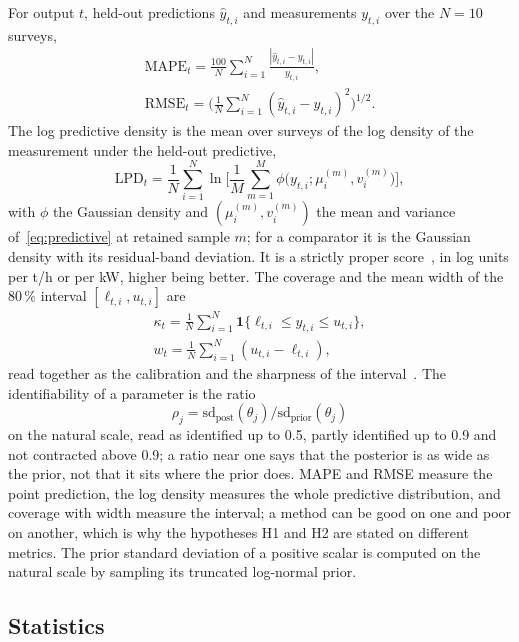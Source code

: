 \documentclass[journal]{IEEEtran}
\newcommand{\pct}{\,\%}
\begin{document}
For output $t$, held-out predictions $\hat y_{t,i}$ and measurements $y_{t,i}$ over the $N=10$ surveys,
\begin{gather}
\mathrm{MAPE}_t=\frac{100}{N}\sum_{i=1}^{N}\frac{|\hat y_{t,i}-y_{t,i}|}{y_{t,i}},\nonumber\\
\mathrm{RMSE}_t=\Big(\frac1N\sum_{i=1}^{N}(\hat y_{t,i}-y_{t,i})^2\Big)^{1/2}.
\label{eq:mape}
\end{gather}
The log predictive density is the mean over surveys of the log density of the measurement under the held-out predictive,
\begin{equation}
\mathrm{LPD}_t=\frac1N\sum_{i=1}^{N}\ln\Big[\frac1M\sum_{m=1}^{M}\phi\big(y_{t,i};\mu_{i}^{(m)},v_{i}^{(m)}\big)\Big],
\label{eq:lpd}
\end{equation}
with $\phi$ the Gaussian density and $(\mu_i^{(m)},v_i^{(m)})$ the mean and variance of~\eqref{eq:predictive} at retained sample
$m$; for a comparator it is the Gaussian density with its residual-band deviation. It is a strictly proper score~\cite{gneiting},
in log units per t/h or per kW, higher being better. The coverage and the mean width of the 80\pct{} interval
$[\ell_{t,i},u_{t,i}]$ are
\begin{gather}
\kappa_t=\frac1N\sum_{i=1}^{N}\mathbf{1}\{\ell_{t,i}\le y_{t,i}\le u_{t,i}\},\nonumber\\
w_t=\frac1N\sum_{i=1}^{N}(u_{t,i}-\ell_{t,i}),
\label{eq:coverage}
\end{gather}
read together as the calibration and the sharpness of the interval~\cite{gneitingcal}. The identifiability of a parameter is the
ratio
\begin{equation}
\rho_j=\mathrm{sd}_{\mathrm{post}}(\theta_j)/\mathrm{sd}_{\mathrm{prior}}(\theta_j)
\label{eq:ratio}
\end{equation}
on the natural scale, read as identified up to 0.5, partly identified up to 0.9 and not contracted above 0.9; a ratio near one says that the
posterior is as wide as the prior, not that it sits where the prior does. MAPE and RMSE
measure the point prediction, the log density measures the whole predictive distribution, and coverage with width measure
the interval; a method can be good on one and poor on another, which is why the hypotheses H1 and H2 are stated on different
metrics. The prior standard deviation of a positive scalar is computed on the natural scale by sampling its truncated
log-normal prior.

\subsection{Statistics}
\end{document}

